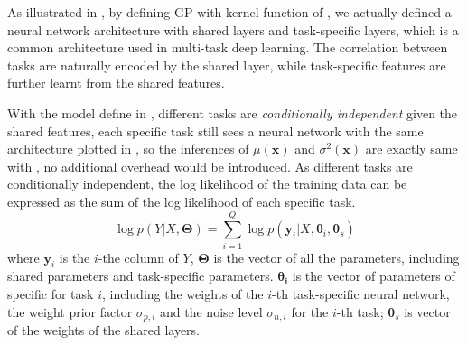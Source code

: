 As illustrated in , by defining GP with kernel function of , we actually defined a neural network architecture with shared layers and task-specific layers, which is a common architecture used in multi-task deep learning\cite{ruder2017overview}. The correlation between tasks are naturally encoded by the shared layer, while task-specific features are further learnt from the shared features. 

With the model define in , different tasks are \emph{conditionally independent} given the shared features, each specific task still sees a neural network with the same architecture plotted in , so the inferences of $\mu(\bm{x})$ and $\sigma^2(\bm{x})$ are exactly same with , no additional overhead would be introduced. As different tasks are conditionally independent, the log likelihood of the training data can be expressed as the sum of the log likelihood of each specific task.
\begin{equation}
    \label{eq:mo_likelihood}
    \log p(Y | X, \bm{\Theta}) = \sum_{i=1}^Q \log p(\bm{y}_i | X, \bm{\theta}_i, \bm{\theta}_s)
\end{equation}
where $\bm{y}_i$ is the $i$-the column of $Y$, $\bm{\Theta}$ is the vector of all the parameters, including shared parameters and task-specific parameters. $\bm{\theta_i}$ is the vector of parameters of specific for task $i$, including the weights of the $i$-th task-specific neural network, the weight prior factor $\sigma_{p, i}$ and the noise level $\sigma_{n, i}$ for the $i$-th task; $\bm{\theta}_s$ is vector of the weights of the shared layers.
